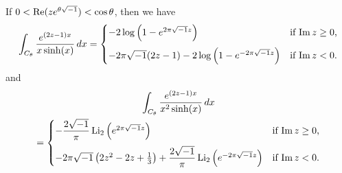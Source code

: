 \begin{lem}\label{lem:L1_2}
If $0<\operatorname{Re}(ze^{\theta\sqrt{-1}})<\cos\theta$, then we have
\begin{equation*}
  \int_{C_{\theta}}\frac{e^{(2z-1)x}}{x\sinh(x)}\,dx
  =
  \begin{cases}
    -2\log\left(1-e^{2\pi\sqrt{-1} z}\right)&\text{if $\operatorname{Im}{z}\ge0$,}
    \\[3mm]
    -2\pi\sqrt{-1}(2z-1)-2\log\left(1-e^{-2\pi\sqrt{-1} z}\right)&\text{if $\operatorname{Im}{z}<0$.}
  \end{cases}
\end{equation*}
and
\begin{multline*}
  \int_{C_{\theta}}\frac{e^{(2z-1)x}}{x^2\sinh(x)}\,dx
  \\
  =
  \begin{cases}
    -\dfrac{2\sqrt{-1}}{\pi}\operatorname{Li}_2\left(e^{2\pi\sqrt{-1} z}\right)&\text{if $\operatorname{Im}{z}\ge0$,}
    \\[3mm]
    -2\pi\sqrt{-1}\left(2z^2-2z+\frac{1}{3}\right)+\dfrac{2\sqrt{-1}}{\pi}\operatorname{Li}_2\left(e^{-2\pi\sqrt{-1} z}\right)
    &\text{if $\operatorname{Im}{z}<0$}.
  \end{cases}
\end{multline*}
\end{lem}
